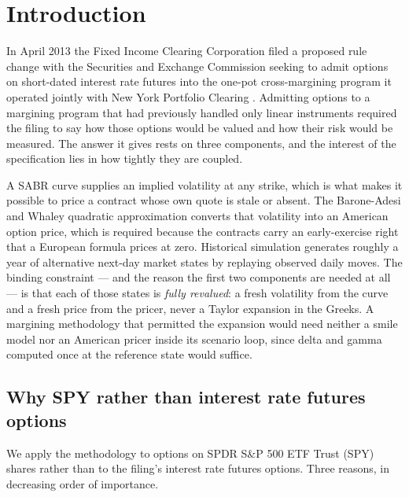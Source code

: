 \documentclass[11pt]{article}
\begin{document}
\section{Introduction}

In April 2013 the Fixed Income Clearing Corporation filed a proposed rule change with
the Securities and Exchange Commission seeking to admit options on short-dated interest
rate futures into the one-pot cross-margining program it operated jointly with New York
Portfolio Clearing \citep{ficc2013}. Admitting options to a margining program that had
previously handled only linear instruments required the filing to say how those options
would be valued and how their risk would be measured. The answer it gives rests on three
components, and the interest of the specification lies in how tightly they are coupled.

A SABR curve \citep{hagan2002} supplies an implied volatility at any strike, which is
what makes it possible to price a contract whose own quote is stale or absent. The
Barone-Adesi and Whaley \citeyearpar{baw1987} quadratic approximation converts that
volatility into an American option price, which is required because the contracts carry
an early-exercise right that a European formula prices at zero. Historical simulation
generates roughly a year of alternative next-day market states by replaying observed
daily moves. The binding constraint --- and the reason the first two components are
needed at all --- is that each of those states is \emph{fully revalued}: a fresh
volatility from the curve and a fresh price from the pricer, never a Taylor expansion
in the Greeks. A margining methodology that permitted the expansion would need neither a
smile model nor an American pricer inside its scenario loop, since delta and gamma
computed once at the reference state would suffice.

\subsection{Why SPY rather than interest rate futures options}

We apply the methodology to options on SPDR S\&P 500 ETF Trust (SPY) shares rather
than to the filing's interest rate futures options. Three reasons, in decreasing order
of importance.
\end{document}
